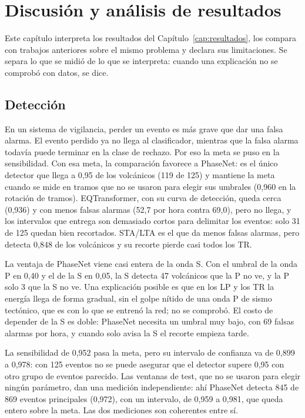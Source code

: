 \chapter{Discusión y análisis de resultados}
\label{cap:discusion}

Este capítulo interpreta los resultados del Capítulo~\ref{cap:resultados},
los compara con trabajos anteriores sobre el mismo problema y declara sus
limitaciones. Se separa lo que se midió de lo que se interpreta: cuando una
explicación no se comprobó con datos, se dice.

\section{Detección}
\label{sec:disc-deteccion}

En un sistema de vigilancia, perder un evento es más grave que dar una falsa
alarma. El evento perdido ya no llega al clasificador, mientras que la falsa
alarma todavía puede terminar en la clase de rechazo. Por eso la meta se puso
en la sensibilidad. Con esa meta, la comparación favorece a PhaseNet: es el
único detector que llega a 0,95 de los volcánicos (119 de 125) y mantiene la
meta cuando se mide en tramos que no se usaron para elegir sus umbrales (0,960
en la rotación de tramos). EQTransformer, con su curva de detección, queda
cerca (0,936) y con menos falsas alarmas (52,7 por hora contra 69,0), pero no
llega, y los intervalos que entrega son demasiado cortos para delimitar los
eventos: solo 31 de 125 quedan bien recortados. STA/LTA es el que da menos
falsas alarmas, pero detecta 0,848 de los volcánicos y su recorte pierde casi
todos los TR.

La ventaja de PhaseNet viene casi entera de la onda S. Con el umbral de la
onda P en 0,40 y el de la S en 0,05, la S detecta 47 volcánicos que la P no
ve, y la P solo 3 que la S no ve. Una explicación posible es que en los LP y
los TR la energía llega de forma gradual, sin el golpe nítido de una onda P de
sismo tectónico, que es con lo que se entrenó la red; no se comprobó. El costo
de depender de la S es doble: PhaseNet necesita un umbral muy bajo, con 69
falsas alarmas por hora, y cuando solo avisa la S el recorte empieza tarde.

La sensibilidad de 0,952 pasa la meta, pero su intervalo de confianza va de
0,899 a 0,978: con 125 eventos no se puede asegurar que el detector supere
0,95 con otro grupo de eventos parecido. Las ventanas de test, que no se
usaron para elegir ningún parámetro, dan una medición independiente: ahí
PhaseNet detecta 845 de 869 eventos principales (0,972), con un intervalo, de
0,959 a 0,981, que queda entero sobre la meta. Las dos mediciones son
coherentes entre sí.

